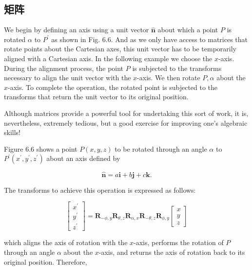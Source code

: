 \subsection{矩阵}
We begin by defining an axis using a unit vector $\hat{\mathbf{n}}$ about which a point $P$ is rotated $\alpha$ to $P^{\prime}$ as shown in Fig. 6.6. And as we only have access to matrices that rotate points about the Cartesian axes, this unit vector has to be temporarily aligned with a Cartesian axis. In the following example we choose the $x$-axis. During the alignment process, the point $P$ is subjected to the transforms necessary to align the unit vector with the $x$-axis. We then rotate $P, \alpha$ about the $x$-axis. To complete the operation, the rotated point is subjected to the transforms that return the unit vector to its original position.

Although matrices provide a powerful tool for undertaking this sort of work, it is, nevertheless, extremely tedious, but a good exercise for improving one's algebraic skills!

Figure $6.6$ shows a point $P(x, y, z)$ to be rotated through an angle $\alpha$ to $P^{\prime}\left(x^{\prime}, y^{\prime}, z^{\prime}\right)$ about an axis defined by

$$
\hat{\mathbf{n}}=a \mathbf{i}+b \mathbf{j}+c \mathbf{k} .
$$

The transforms to achieve this operation is expressed as follows:

$$
\left[\begin{array}{c}
x^{\prime} \\
y^{\prime} \\
z^{\prime}
\end{array}\right]=\mathbf{R}_{-\phi, y} \mathbf{R}_{\theta, z} \mathbf{R}_{\alpha, x} \mathbf{R}_{-\theta, z} \mathbf{R}_{\phi, y}\left[\begin{array}{c}
x \\
y \\
z
\end{array}\right]
$$

which aligns the axis of rotation with the $x$-axis, performs the rotation of $P$ through an angle $\alpha$ about the $x$-axis, and returns the axis of rotation back to its original position. Therefore,

